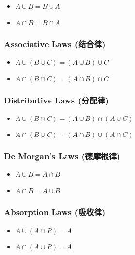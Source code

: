 \documentclass[10pt,a4paper,openany]{ctexbook}
\theoremstyle{definition}
\theoremstyle{remark}
\begin{document}
\begin{itemize}
\item $A \cup B = B \cup A$
\item $A \cap B = B \cap A$

\end{itemize}

\subsubsection{Associative Laws (结合律)}

\begin{itemize}
\item $A \cup (B \cup C) = (A \cup B) \cup C$
\item $A \cap (B \cap C) = (A \cap B) \cap C$

\end{itemize}

\subsubsection{Distributive Laws (分配律)}

\begin{itemize}
\item $A \cup (B \cap C) = (A \cup B) \cap (A \cup C)$
\item $A \cap (B \cup C) = (A \cap B) \cup (A \cap C)$

\end{itemize}

\subsubsection{De Morgan's Laws (德摩根律)}

\begin{itemize}
\item $\overline{A \cup B} = \overline{A} \cap \overline{B}$
\item $\overline{A \cap B} = \overline{A} \cup \overline{B}$

\end{itemize}

\subsubsection{Absorption Laws (吸收律)}

\begin{itemize}
\item $A \cup (A \cap B) = A$
\item $A \cap (A \cup B) = A$

\end{itemize}
\end{document}
